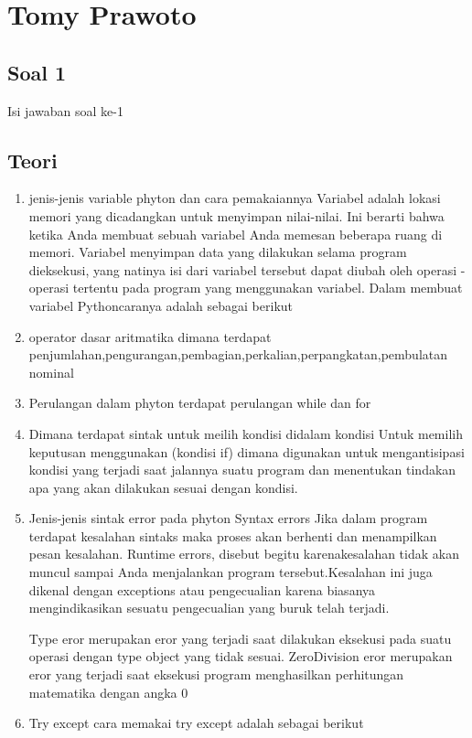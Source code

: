 \section{Tomy Prawoto}
\subsection{Soal 1}
Isi jawaban soal ke-1

\subsection{Teori}
\begin{enumerate}
	\item jenis-jenis variable phyton dan cara pemakaiannya
Variabel adalah lokasi memori yang dicadangkan untuk menyimpan nilai-nilai. Ini berarti bahwa ketika Anda membuat sebuah variabel Anda memesan beberapa ruang di memori. Variabel menyimpan data yang dilakukan selama program dieksekusi, yang natinya isi dari variabel tersebut dapat diubah oleh operasi - operasi tertentu pada program yang menggunakan variabel. Dalam membuat variabel Pythoncaranya adalah sebagai berikut
    
    \item operator dasar aritmatika
dimana terdapat penjumlahan,pengurangan,pembagian,perkalian,perpangkatan,pembulatan nominal
    
    \item Perulangan
dalam phyton terdapat perulangan while dan for
    
    \item Dimana terdapat sintak untuk meilih kondisi didalam kondisi
Untuk memilih keputusan menggunakan (kondisi if) dimana digunakan untuk mengantisipasi kondisi yang terjadi saat jalannya suatu program dan menentukan tindakan apa yang akan dilakukan sesuai dengan kondisi.
    

    \item Jenis-jenis sintak error pada phyton
 Syntax errors Jika dalam program terdapat kesalahan sintaks maka proses akan berhenti dan menampilkan pesan kesalahan.
Runtime errors, disebut begitu karenakesalahan tidak akan muncul sampai Anda menjalankan program tersebut.Kesalahan ini juga dikenal dengan exceptions atau pengecualian karena biasanya mengindikasikan sesuatu pengecualian yang buruk telah terjadi.

Type eror merupakan eror yang terjadi saat dilakukan eksekusi pada suatu operasi dengan type object yang tidak sesuai.
ZeroDivision eror merupakan eror yang terjadi saat eksekusi program menghasilkan perhitungan matematika dengan angka 0

 \item Try except
cara memakai try except adalah sebagai berikut
    
    \end{enumerate}
